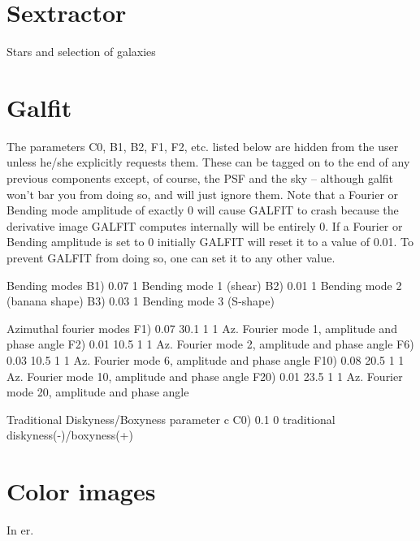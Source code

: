 \section{Sextractor}

Stars and selection of galaxies

\section{Galfit}

 The parameters C0, B1, B2, F1, F2, etc. listed below are hidden 
 from the user unless he/she explicitly requests them.  These can  be tagged on to the end of any previous components except, of 
 course, the PSF and the sky -- although galfit won't bar you from doing 
 so, and will just ignore them.  Note that a Fourier or Bending mode 
 amplitude of exactly 0 will cause GALFIT to crash because the 
 derivative image GALFIT computes internally will be entirely 0.  If a 
 Fourier or Bending amplitude is set to 0 initially GALFIT will reset it  
 to a value of 0.01.  To prevent GALFIT from doing so, one can set it to any 
 other value.

  Bending modes
B1)  0.07      1        Bending mode 1 (shear)
B2)  0.01      1        Bending mode 2 (banana shape)
B3)  0.03      1        Bending mode 3 (S-shape)

  Azimuthal fourier modes
F1)  0.07  30.1  1  1   Az. Fourier mode 1, amplitude and phase angle
F2)  0.01  10.5  1  1   Az. Fourier mode 2, amplitude and phase angle
F6)  0.03  10.5  1  1  Az. Fourier mode 6, amplitude and phase angle
F10)  0.08  20.5  1  1   Az. Fourier mode 10, amplitude and phase angle
F20)  0.01  23.5  1  1   Az. Fourier mode 20, amplitude and phase angle

  Traditional Diskyness/Boxyness parameter c
C0) 0.1         0       traditional diskyness(-)/boxyness(+)

\section{Color images}


In er.  

